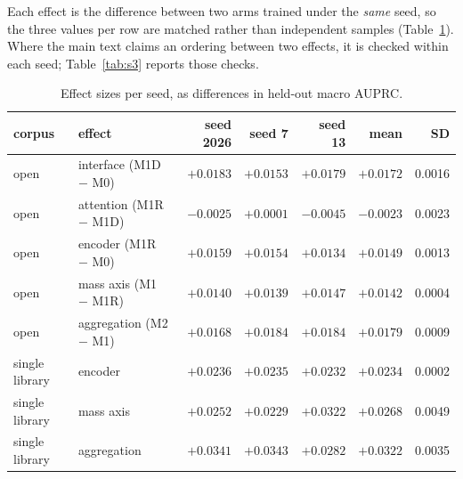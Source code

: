 \documentclass[11pt]{article}
\begin{document}
Each effect is the difference between two arms trained under the \emph{same} seed,
so the three values per row are matched rather than independent samples
(Table~\ref{tab:s2}). Where the main text claims an ordering between two effects, it
is checked within each seed; Table~\ref{tab:s3} reports those checks.

\begin{table}[htbp]
\centering
\caption{Effect sizes per seed, as differences in held-out macro AUPRC.}
\label{tab:s2}
\small
\begin{tabular}{l l r r r r r}
\toprule
corpus & effect & seed 2026 & seed 7 & seed 13 & mean & SD \\
\midrule
open & interface (M1D $-$ M0)   & $+0.0183$ & $+0.0153$ & $+0.0179$ & $+0.0172$ & 0.0016 \\
open & attention (M1R $-$ M1D)  & $-0.0025$ & $+0.0001$ & $-0.0045$ & $-0.0023$ & 0.0023 \\
open & encoder (M1R $-$ M0)     & $+0.0159$ & $+0.0154$ & $+0.0134$ & $+0.0149$ & 0.0013 \\
open & mass axis (M1 $-$ M1R)   & $+0.0140$ & $+0.0139$ & $+0.0147$ & $+0.0142$ & 0.0004 \\
open & aggregation (M2 $-$ M1)  & $+0.0168$ & $+0.0184$ & $+0.0184$ & $+0.0179$ & 0.0009 \\
\midrule
single library & encoder     & $+0.0236$ & $+0.0235$ & $+0.0232$ & $+0.0234$ & 0.0002 \\
single library & mass axis   & $+0.0252$ & $+0.0229$ & $+0.0322$ & $+0.0268$ & 0.0049 \\
single library & aggregation & $+0.0341$ & $+0.0343$ & $+0.0282$ & $+0.0322$ & 0.0035 \\
\bottomrule
\end{tabular}
\end{table}
\end{document}
